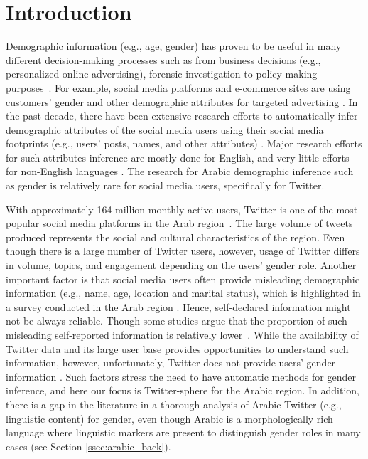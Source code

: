 \documentclass[sigconf,authorversion,nonacm]{acmart}
\begin{document}
\section{Introduction}
\label{sec:introduction}
Demographic information (e.g., age, gender) has proven to be useful in many different decision-making processes such as from business decisions (e.g., personalized online advertising), forensic investigation to policy-making purposes~\cite{li-etal-2016-semi, volkova-etal-2013-exploring, mukherjee-liu-2010-improving,soler-wanner-2016-semi}. For example, social media platforms and e-commerce sites are using customers' gender and other demographic attributes for targeted advertising \cite{9023806}. In the past decade, there have been extensive research efforts to automatically infer demographic attributes of the social media users using their social media footprints (e.g., users' posts, names, and other attributes) \cite{chen2015comparative,volkova2015inferring}. Major research efforts for such attributes inference are mostly done for English, and very little efforts for non-English languages \cite{ciot2013gender}. The research for Arabic demographic inference such as gender is relatively rare for social media users, specifically for Twitter. 
 
With approximately 164 million monthly active users, Twitter is one of the most popular social media platforms in the Arab region~\cite{abdelali2020arabic}. The large volume of tweets produced represents the social and cultural characteristics of the region. Even though there is a large number of Twitter users, however, usage of Twitter differs in volume, topics, and engagement depending on the users' gender role. Another important factor is that social media users often provide misleading demographic information (e.g., name, age, location and marital status), which is highlighted in a survey conducted in the Arab region \cite{salem2017social}. Hence, self-declared information might not be always  reliable. Though some studies argue that the proportion of such misleading self-reported information is relatively lower~\cite{herring2014gender}. While the availability of Twitter data and its large user base provides opportunities to understand such information, however, unfortunately, Twitter does not provide users' gender information \cite{mueller2016gender}. Such factors stress the need to have automatic methods for gender inference, and here our focus is Twitter-sphere for the Arabic region. In addition, there is a gap in the literature in a thorough analysis of Arabic Twitter (e.g., linguistic content) for gender, even though Arabic is a morphologically rich language where linguistic markers are present to distinguish gender roles in many cases (see Section \ref{ssec:arabic_back}).
\end{document}
